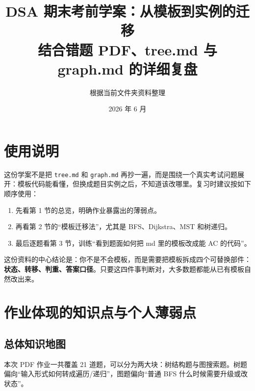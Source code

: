 \documentclass[10pt,a4paper,fontset=none]{ctexart}
\title{\bfseries DSA 期末考前学案：从模板到实例的迁移\\\large 结合错题 PDF、tree.md 与 graph.md 的详细复盘}
\author{根据当前文件夹资料整理}
\date{2026 年 6 月}
\begin{document}
\maketitle
\tableofcontents
\newpage

\section*{使用说明}
这份学案不是把 \texttt{tree.md} 和 \texttt{graph.md} 再抄一遍，而是围绕一个真实考试问题展开：模板代码能看懂，但换成题目实例之后，不知道该改哪里。复习时建议按如下顺序使用：
\begin{enumerate}
  \item 先看第 1 节的总览，明确作业暴露出的薄弱点。
  \item 再看第 2 节的“模板迁移法”，尤其是 BFS、Dijkstra、MST 和树递归。
  \item 最后逐题看第 3 节，训练“看到题面如何把 md 里的模板改成能 AC 的代码”。
\end{enumerate}

\begin{focusbox}
这份资料的中心结论是：你不是不会模板，而是需要把模板拆成四个可替换部件：\textbf{状态、转移、判重、答案口径}。只要这四件事判断对，大多数题都能从已有模板自然改出来。
\end{focusbox}

\section{作业体现的知识点与个人薄弱点}

\subsection{总体知识地图}
本次 PDF 作业一共覆盖 21 道题，可以分为两大块：树结构题与图搜索题。树题偏向“输入形式如何转成遍历/递归”，图题偏向“普通 BFS 什么时候需要升级或改状态”。
\end{document}
